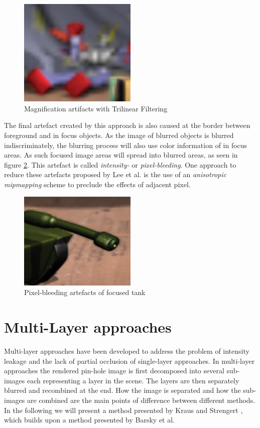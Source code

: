\begin{figure}[h]
    \centering
    \includegraphics[width=0.5\textwidth]{images/trilinear-filtering.jpg}
    \caption{Magnification artifacts with Trilinear Filtering \cite{Demers.2005}}
    \label{fig:trilinear-filtering}
\end{figure}

The final artefact created by this approach is also caused at the border between foreground and in focus objects.
As the image of blurred objects is blurred indiscriminately, the blurring process will also use color information of in focus areas.
As such focused image areas will spread into blurred areas, as seen in figure \ref{fig:pxl-bleeeding}.
This artefact is called \textit{intensity-} or \textit{pixel-bleeding}.\cite{Demers.2005}
One approach to reduce these artefacts proposed by Lee et al. \cite{Lee.2009} is the use of an \textit{anisotropic mipmapping} scheme to preclude the effects of adjacent pixel.

\begin{figure}[h]
    \centering
    \includegraphics[width=0.5\textwidth]{images/pixel-bleeding.jpg}
    \caption{Pixel-bleeding artefacts of focused tank \cite{Demers.2005}}
    \label{fig:pxl-bleeeding}
\end{figure}

\section{Multi-Layer approaches}
Multi-layer approaches have been developed to address the problem of intensity leakage and the lack of partial occlusion of single-layer approaches.
In multi-layer approaches the rendered pin-hole image is first decomposed into several sub-images each representing a layer in the scene.
The layers are then separately blurred and recombined at the end.
How the image is separated and how the sub-images are combined are the main points of difference between different methods.
In the following we will present a method presented by Kraus and Strengert \cite{Kraus.2007}, which builds upon a method presented by Barsky et al.\cite{BrianA.Barsky.2005}

